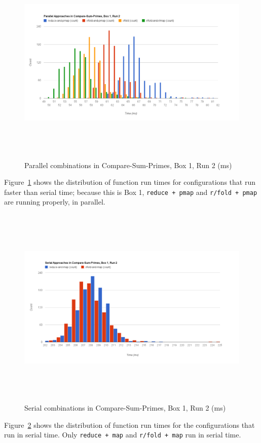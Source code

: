 \documentclass[12pt]{article}
\newcommand{\clocode}[1]{{\texttt {#1}}}
\begin{document}
\begin{figure}[h!]
\includegraphics[trim = 10mm 10mm 30mm 30mm, clip, width = 16cm,height = 10cm]{PSP-B1}
\caption{Parallel combinations in Compare-Sum-Primes, Box 1, Run 2 (ms)}\label{figure:parallel}
\end{figure}
 Figure~\ref{figure:parallel} shows the distribution of function run times for configurations that run faster than serial time; because this is Box 1, \clocode{reduce + pmap} and \clocode{r/fold + pmap} are running properly, in parallel. 
\begin{figure}[h!]
\includegraphics[trim = 10mm 10mm 10mm 30mm, clip, width = 16cm,height = 9.75cm]{SSP-B1}
\caption{Serial combinations in Compare-Sum-Primes, Box 1, Run 2 (ms)}\label{figure:serial}
\end{figure}
Figure~\ref{figure:serial} shows the distribution of function run times for the configurations that run in serial time. Only \clocode{reduce + map} and \clocode{r/fold + map} run in serial time.
\end{document}
